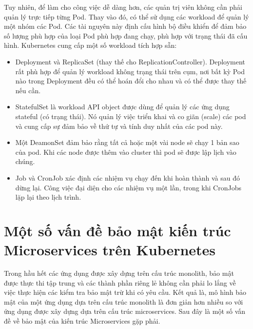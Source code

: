 \documentclass[14pt,a4paper]{report}
\begin{document}
	\hspace{0.3cm}Tuy nhiên, để làm cho công việc dễ dàng hơn, các quản trị viên không cần phải quản lý trực tiếp từng Pod. Thay vào đó, có thể sử dụng các workload để quản lý một nhóm các Pod. Các tài nguyên này định cấu hình bộ điều khiển để đảm bảo số lượng phù hợp của loại Pod phù hợp đang chạy, phù hợp với trạng thái đã cấu hình. Kubernetes cung cấp một số workload tích hợp sẵn:
	\begin{itemize}				
		\item Deployment và ReplicaSet (thay thế cho ReplicationController). Deployment rất phù hợp để quản lý workload không trạng thái trên cụm, nơi bất kỳ Pod nào trong Deployment đều có thể hoán đổi cho nhau và có thể được thay thế nếu cần.
		\item StatefulSet là workload API object được dùng để quản lý các ứng dụng stateful (có trạng thái). Nó quản lý việc triển khai và co giãn (scale) các pod và cung cấp sự đảm bảo về thứ tự và tính duy nhất của các pod này.
		\item  Một DeamonSet đảm bảo rằng tất cả hoặc một vài node sẽ chạy 1 bản sao của pod. Khi các node được thêm vào cluster thì pod sẽ được lập lịch vào chúng.
		\item  Job và CronJob xác định các nhiệm vụ chạy đến khi hoàn thành và sau đó dừng lại. Công việc đại diện cho các nhiệm vụ một lần, trong khi CronJobs lặp lại theo lịch trình.
	\end{itemize}
	\section{Một số vấn đề bảo mật kiến trúc Microservices trên Kubernetes}
	{\hspace{1cm}Trong hầu hết các ứng dụng được xây dựng trên cấu trúc monolith, bảo mật được thực thi tập trung và các thành phần riêng lẻ không cần phải lo lắng về việc thực hiện các kiểm tra bảo mật trừ khi có yêu cầu. Kết quả là, mô hình bảo mật của một ứng dụng dựa trên cấu trúc monolith là đơn giản hơn nhiều so với ứng dụng được xây dựng dựa trên cấu trúc microservices. Sau đây là một số vấn đề về bảo mật của kiến trúc Microservices gặp phải.\\}			
\end{document}
